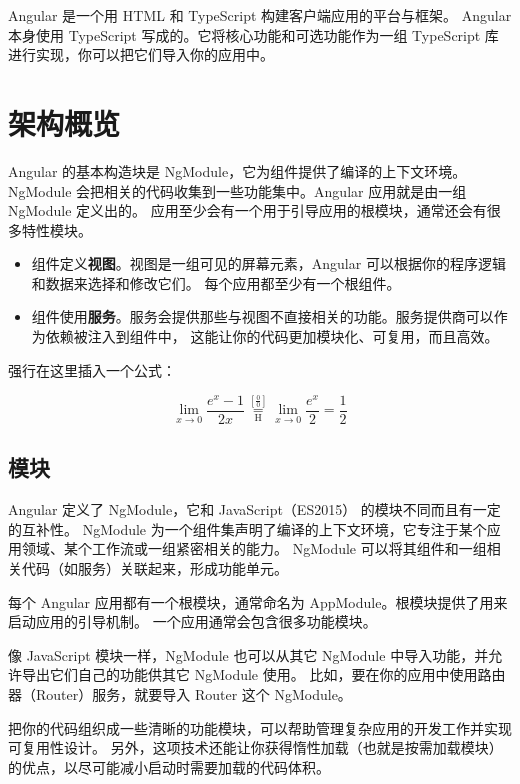 \documentclass{progbookcn}
\begin{document}
Angular 是一个用 HTML 和 TypeScript 构建客户端应用的平台与框架。 Angular 本身使用 TypeScript 写成的。它将核心功能和可选功能作为一组 TypeScript 库进行实现，你可以把它们导入你的应用中。


\section{架构概览}

Angular 的基本构造块是 NgModule，它为组件提供了编译的上下文环境。 NgModule 会把相关的代码收集到一些功能集中。Angular 应用就是由一组 NgModule 定义出的。 应用至少会有一个用于引导应用的根模块，通常还会有很多特性模块。

\begin{itemize}
  \item 组件定义\textbf{视图}。视图是一组可见的屏幕元素，Angular 可以根据你的程序逻辑和数据来选择和修改它们。 每个应用都至少有一个根组件。
  \item 组件使用\textbf{服务}。服务会提供那些与视图不直接相关的功能。服务提供商可以作为依赖被注入到组件中， 这能让你的代码更加模块化、可复用，而且高效。
\end{itemize}

强行在这里插入一个公式：

\begin{equation}
  \label{eq:1}
   \lim_{x\to 0}{\frac{e^x-1}{2x}}
   \overset{\left[\frac{0}{0}\right]}{\underset{\mathrm{H}}{=}}
   \lim_{x\to 0}{\frac{e^x}{2}}={\frac{1}{2}}
\end{equation}


\subsection{模块}

Angular 定义了 NgModule，它和 JavaScript（ES2015） 的模块不同而且有一定的互补性。 NgModule 为一个组件集声明了编译的上下文环境，它专注于某个应用领域、某个工作流或一组紧密相关的能力。 NgModule 可以将其组件和一组相关代码（如服务）关联起来，形成功能单元。


每个 Angular 应用都有一个根模块，通常命名为 AppModule。根模块提供了用来启动应用的引导机制。 一个应用通常会包含很多功能模块。

像 JavaScript 模块一样，NgModule 也可以从其它 NgModule 中导入功能，并允许导出它们自己的功能供其它 NgModule 使用。 比如，要在你的应用中使用路由器（Router）服务，就要导入 Router 这个 NgModule。

把你的代码组织成一些清晰的功能模块，可以帮助管理复杂应用的开发工作并实现可复用性设计。 另外，这项技术还能让你获得惰性加载（也就是按需加载模块）的优点，以尽可能减小启动时需要加载的代码体积。
\end{document}
